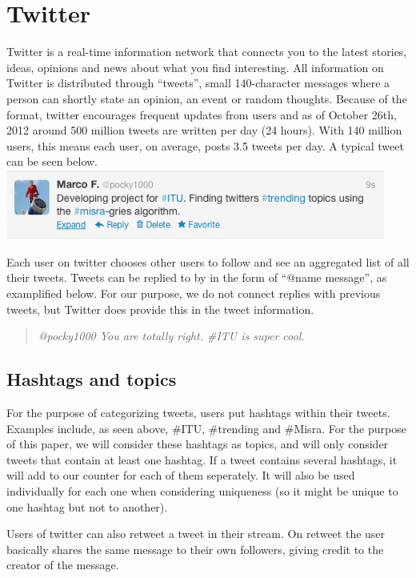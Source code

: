 \section{Twitter}
\label{twitter}
Twitter is a real-time information network that connects you to the latest stories, ideas, opinions and news about what you find interesting. All information on Twitter is distributed through ``tweets'', small 140-character messages where a person can shortly state an opinion, an event or random thoughts. Because of the format, twitter encourages frequent updates from users and as of October 26th, 2012 around 500 million tweets are written per day (24 hours)\cite{Cnet1}. With 140 million users, this means each user, on average, posts 3.5 tweets per day. A typical tweet can be seen below.
\newline
\includegraphics[width=125mm]{tweet.png}
\newline

Each user on twitter chooses other users to follow and see an aggregated list of all their tweets. Tweets can be replied to by in the form of ``@name message'', as examplified below. For our purpose, we do not connect replies with previous tweets, but Twitter does provide this in the tweet information.

\begin{quote}
    \emph{@pocky1000 You are totally right. \#ITU is super cool.}
\end{quote}

\subsection{Hashtags and topics}
For the purpose of categorizing tweets, users put hashtags within their tweets. Examples include, as seen above, \#ITU, \#trending and \#Misra. For the purpose of this paper, we will consider these hashtags as topics, and will only consider tweets that contain at least one hashtag. If a tweet contains several hashtags, it will add to our counter for each of them seperately. It will also be used individually for each one when considering uniqueness (so it might be unique to one hashtag but not to another).

Users of twitter can also retweet a tweet in their stream. On retweet the user basically shares the same message to their own followers, giving credit to the creator of the message.

